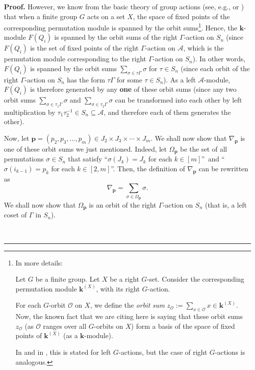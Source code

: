 \documentclass[numbers=enddot,12pt,final,onecolumn,notitlepage]{scrartcl}%
\theoremstyle{definition}
\newenvironment{proof}[1][Proof]{\noindent\textbf{#1.} }{\ \rule{0.5em}{0.5em}}
\let\sumnonlimits\sum
\renewcommand{\sum}{\sumnonlimits\limits}
\begin{document}
\begin{proof}
However, we know from the basic theory of group actions (see, e.g.,
\cite[\S 3.3.1, \textquotedblleft Invariants of Permutation
Representations\textquotedblright]{Lorenz18} or \cite[Proposition
A.2]{GriPar25}) that when a finite group $G$ acts on a set $X$, the space of
fixed points of the corresponding permutation module is spanned by the orbit
sums\footnote{In more details:
\par
Let $G$ be a finite group. Let $X$ be a right $G$-set. Consider the
corresponding permutation module $\mathbf{k}^{\left(  X\right)  }$, with its
right $G$-action.
\par
For each $G$-orbit $\mathcal{O}$ on $X$, we define the \emph{orbit sum}
$z_{\mathcal{O}}:=\sum_{x\in\mathcal{O}}x\in\mathbf{k}^{\left(  X\right)  }$.
Now, the known fact that we are citing here is saying that these orbit sums
$z_{\mathcal{O}}$ (as $\mathcal{O}$ ranges over all $G$-orbits on $X$) form a
basis of the space of fixed points of $\mathbf{k}^{\left(  X\right)  }$ (as a
$\mathbf{k}$-module).
\par
In \cite[\S 3.3.1, \textquotedblleft Invariants of Permutation
Representations\textquotedblright]{Lorenz18} and in \cite[Proposition
A.2]{GriPar25}, this is stated for left $G$-actions, but the case of right
$G$-actions is analogous.}. Hence, the $\mathbf{k}$-module $F\left(
Q_{i}\right)  $ is spanned by the orbit sums of the right $\Gamma$-action on
$S_{n}$ (since $F\left(  Q_{i}\right)  $ is the set of fixed points of the
right $\Gamma$-action on $\mathcal{A}$, which is the permutation module
corresponding to the right $\Gamma$-action on $S_{n}$). In other words,
$F\left(  Q_{i}\right)  $ is spanned by the orbit sums $\sum_{\sigma\in
\tau\Gamma}\sigma$ for $\tau\in S_{n}$ (since each orbit of the right $\Gamma
$-action on $S_{n}$ has the form $\tau\Gamma$ for some $\tau\in S_{n}$). As a
left $\mathcal{A}$-module, $F\left(  Q_{i}\right)  $ is therefore generated by
any \textbf{one} of these orbit sums (since any two orbit sums $\sum
_{\sigma\in\tau_{1}\Gamma}\sigma$ and $\sum_{\sigma\in\tau_{2}\Gamma}\sigma$
can be transformed into each other by left multiplication by $\tau_{1}\tau
_{2}^{-1}\in S_{n}\subseteq\mathcal{A}$, and therefore each of them generates
the other).

Now, let $\mathbf{p}=\left(  p_{2},p_{3},\ldots,p_{m}\right)  \in J_{2}\times
J_{3}\times\cdots\times J_{m}$. We shall now show that $\nabla_{\mathbf{p}}$
is one of these orbit sums we just mentioned. Indeed, let $\Omega_{\mathbf{p}%
}$ be the set of all permutations $\sigma\in S_{n}$ that satisfy
\textquotedblleft$\sigma\left(  J_{k}\right)  =J_{k}$ for each $k\in\left[
m\right]  $\textquotedblright\ and \textquotedblleft$\sigma\left(
i_{k-1}\right)  =p_{k}$ for each $k\in\left[  2,m\right]  $\textquotedblright.
Then, the definition of $\nabla_{\mathbf{p}}$ can be rewritten as%
\begin{equation}
\nabla_{\mathbf{p}}=\sum_{\sigma\in\Omega_{\mathbf{p}}}\sigma
.\label{pf.lem.Fi/Fi-1.L3.nap=}%
\end{equation}
We shall now show that $\Omega_{\mathbf{p}}$ is an orbit of the right $\Gamma
$-action on $S_{n}$ (that is, a left coset of $\Gamma$ in $S_{n}$).


\end{proof}
\end{document}
